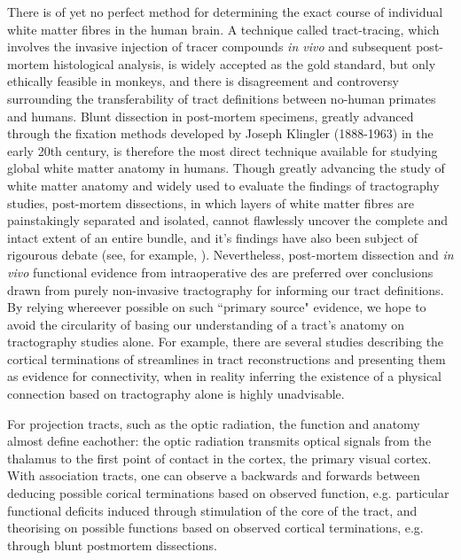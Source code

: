 There is of yet no perfect method for determining the exact course of individual white matter fibres in the human brain.
A technique called tract-tracing, which involves the invasive injection of tracer compounds \textit{in vivo} and subsequent post-mortem histological analysis, is widely accepted as the gold standard, but only ethically feasible in monkeys, and there is disagreement and controversy surrounding the transferability of tract definitions between no-human primates and humans.\autocite{Becker2022,ThiebautdeSchotten2012}
Blunt dissection in post-mortem specimens, greatly advanced through the fixation methods developed by Joseph Klingler (1888-1963) in the early 20th century,\autocite{Agrawal2011} is therefore the most direct technique available for studying global white matter anatomy in humans.
Though greatly advancing the study of white matter anatomy and widely used to evaluate the findings of tractography studies, post-mortem dissections, in which layers of white matter fibres are painstakingly separated and isolated, cannot flawlessly uncover the complete and intact extent of an entire bundle,\autocite{Martino2010, Dick2012} and it's findings have also been subject of rigourous debate (see, for example, \textcite{Giampiccolo2022a,Becker2022,Giampiccolo2022b}).
Nevertheless, post-mortem dissection and \textit{in vivo} functional evidence from intraoperative \gls{des} are preferred over conclusions drawn from purely non-invasive tractography for informing our tract definitions.
By relying whereever possible on such ``primary source" evidence, we hope to avoid the circularity of basing our understanding of a tract's anatomy on tractography studies alone.%
For example, there are several studies describing the cortical terminations of streamlines in tract reconstructions and presenting them as evidence for connectivity,\autocite{Conner2018,Hau2016} when in reality inferring the existence of a physical connection based on tractography alone is highly unadvisable.\autocite{Rheault2020}

For projection tracts, such as the optic radiation, the function and anatomy almost define eachother: the optic radiation transmits optical signals from the thalamus to the first point of contact in the cortex, the primary visual cortex.
With association tracts, one can observe a backwards and forwards between deducing possible corical terminations based on observed function, e.g. particular functional deficits induced through stimulation of the core of the tract, and theorising on possible functions based on observed cortical terminations, e.g. through blunt postmortem dissections.

